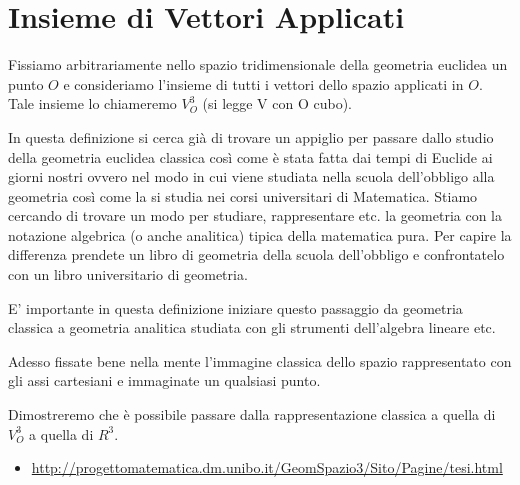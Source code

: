\section{Insieme di Vettori Applicati}
\begin{definizione}
Fissiamo arbitrariamente nello spazio tridimensionale della geometria euclidea un punto $O$ e consideriamo l'insieme di tutti i vettori dello spazio 
applicati in $O$. Tale insieme lo chiameremo $V_{O}^{3}$ (si legge V con O cubo).
\end{definizione}

\begin{osservazione}
In questa definizione si cerca già di trovare un appiglio per passare dallo studio della geometria euclidea classica così come è stata
fatta dai tempi di Euclide ai giorni nostri ovvero nel modo in cui viene studiata nella scuola dell'obbligo alla geometria così come la
si studia nei corsi universitari di Matematica. Stiamo cercando di trovare un modo per studiare, rappresentare etc. la geometria con 
la notazione algebrica (o anche analitica) tipica della matematica pura. Per capire la differenza prendete un libro di geometria della
scuola dell'obbligo e confrontatelo con un libro universitario di geometria.

E' importante in questa definizione iniziare questo passaggio da geometria classica a geometria analitica studiata con gli strumenti
dell'algebra lineare etc.

Adesso fissate bene nella mente l'immagine classica dello spazio rappresentato con gli assi cartesiani e immaginate un qualsiasi punto.

Dimostreremo che è possibile passare dalla rappresentazione classica a quella di $V_{O}^{3}$ a quella di $R^3$.
\end{osservazione}

\begin{osservazione}
\begin{itemize}
 \item \href{http://progettomatematica.dm.unibo.it/GeomSpazio3/Sito/Pagine/tesi.html}{http://progettomatematica.dm.unibo.it/GeomSpazio3/Sito/Pagine/tesi.html}
\end{itemize}
\end{osservazione}

